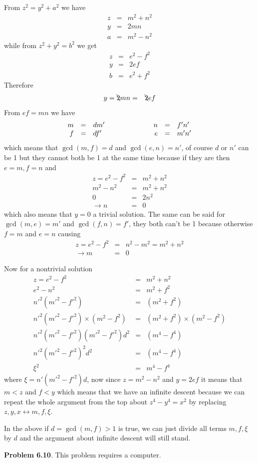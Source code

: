 \documentclass[aps,preprint,preprintnumbers,nofootinbib,showpacs,prd]{revtex4-1}
\newcommand{\nbea}{\begin{eqnarray*}}
\newcommand{\neea}{\end{eqnarray*}}
\begin{document}
From $z^2 = y^2 + a^2$ we have 
%
\nbea
z & = & m^2 + n^2 \\
y & = & 2mn \\
a & = & m^2 - n^2
\neea
%
while from $z^2 + y^2 = b^2$ we get
%
\nbea
z & = & e^2 - f^2 \\
y & = & 2ef \\
b & = & e^2 + f^2
\neea
%
Therefore
%
\nbea
y = \bcancel{2}mn & = & \bcancel{2}ef
\neea
%
From $ef = mn$ we have
%
\nbea
\begin{array}{r c l c r c l}
m & = & dm' & ~~~~~~~~~~~~~~~ & n & = & f' n'\\
f & = & df' & ~~~~~~~~~~~~~~~ & e & = & m'n'
\end{array}
\neea
%
which means that $\gcd(m,f) = d$ and $\gcd(e,n) = n'$, of course $d$ or $n'$ can be 1 but they cannot both be 1 at the same time because if they are then $e = m, f = n$ and 
%
\nbea
z = e^2 - f^2 & = & m^2 + n^2 \\
m^2 - n^2 & = & m^2 + n^2 \\
0 & = & 2n^2 \\
\to n & = & 0
\neea
%
which also means that $y=0$ a trivial solution. The same can be said for $\gcd(m,e) = m'$ and $\gcd(f,n) = f'$, they both can't be 1 because otherwise $f = m$ and $e = n$ causing
%
\nbea
z = e^2 - f^2 & = & n^2 - m^2 = m^2 + n^2 \\
\to m & = & 0
\neea
%


Now for a nontrivial solution
%
\nbea
z = e^2 - f^2 & = & m^2 + n^2 \\
e^2 - n^2 & = & m^2 + f^2 \\
n'^2(m'^2 - f'^2) & = & (m^2 + f^2) \\
n'^2(m'^2 - f'^2)\times(m^2-f^2) & = & (m^2 + f^2)\times(m^2 - f^2) \\
n'^2(m'^2 - f'^2)(m'^2-f'^2) d^2 & = & (m^4 - f^4) \\
n'^2(m'^2 - f'^2)^2d^2 & = & (m^4 - f^4) \\
\xi^2 & = & m^4 - f^4
\neea
%
where $\xi = n'(m'^2-f'^2)d$, now since $z = m^2 - n^2$ and $y = 2ef$ it means that $m < z$ and $f < y$ which means that we have an infinite descent because we can repeat the whole argument from the top about $z^4-y^4=x^2$ by replacing $z,y,x \leftrightarrow m,f,\xi$.

In the above if $d = \gcd(m,f)>1$ is true, we can just divide all terms $m,f,\xi$ by $d$ and the argument about infinite descent will still stand.

{\bf Problem 6.10}. This problem requires a computer.
\end{document}

